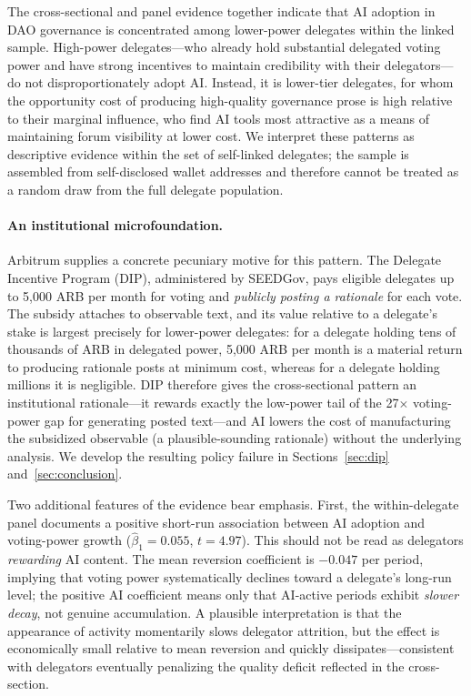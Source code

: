 \documentclass[12pt]{article}
\begin{document}
The cross-sectional and panel evidence together indicate that AI adoption in DAO
governance is concentrated among lower-power delegates within the linked sample. High-power
delegates---who already hold substantial delegated voting power and have strong
incentives to maintain credibility with their delegators---do not disproportionately
adopt AI. Instead, it is lower-tier delegates, for whom the opportunity cost of
producing high-quality governance prose is high relative to their marginal influence,
who find AI tools most attractive as a means of maintaining forum visibility at lower
cost. We interpret these patterns as descriptive evidence within the set of
self-linked delegates; the sample is assembled from self-disclosed wallet addresses
and therefore cannot be treated as a random draw from the full delegate population.

\paragraph{An institutional microfoundation.}
Arbitrum supplies a concrete pecuniary motive for this pattern. The Delegate
Incentive Program (DIP), administered by SEEDGov, pays eligible delegates up to
5{,}000 ARB per month for voting and \emph{publicly posting a rationale} for each
vote. The subsidy attaches to observable text, and its value
relative to a delegate's stake is largest precisely for lower-power delegates: for a
delegate holding tens of thousands of ARB in delegated power, 5{,}000 ARB per month
is a material return to producing rationale posts at minimum cost, whereas for a
delegate holding millions it is negligible. DIP therefore gives the cross-sectional
pattern an institutional rationale---it rewards exactly the low-power tail of the
27$\times$ voting-power gap for generating posted text---and AI lowers the cost of
manufacturing the subsidized observable (a plausible-sounding rationale) without the
underlying analysis. We develop the resulting policy failure in
Sections~\ref{sec:dip} and~\ref{sec:conclusion}.

Two additional features of the evidence bear emphasis. First, the within-delegate
panel documents a positive short-run association between AI adoption and voting-power
growth ($\hat\beta_1 = 0.055$, $t = 4.97$). This should not be read as delegators
\emph{rewarding} AI content. The mean reversion coefficient is $-0.047$ per period,
implying that voting power systematically declines toward a delegate's long-run
level; the positive AI coefficient means only that AI-active periods exhibit
\emph{slower decay}, not genuine accumulation. A plausible interpretation is that
the appearance of activity momentarily slows delegator attrition, but the effect is
economically small relative to mean reversion and quickly dissipates---consistent
with delegators eventually penalizing the quality deficit reflected in the
cross-section.
\end{document}

